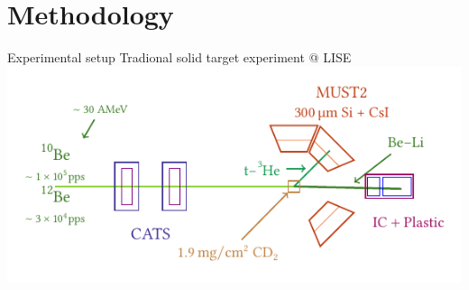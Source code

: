 \documentclass[aspectratio=43, dvipsnames]{beamer}
\begin{document}
\section{Methodology}
\begin{frame}[c]{Experimental setup}
    Tradional solid target experiment @ LISE
    \vspace{1.5em}
    \includegraphics[width=1\linewidth]{figures/setup.pdf}
\end{frame}
\end{document}
